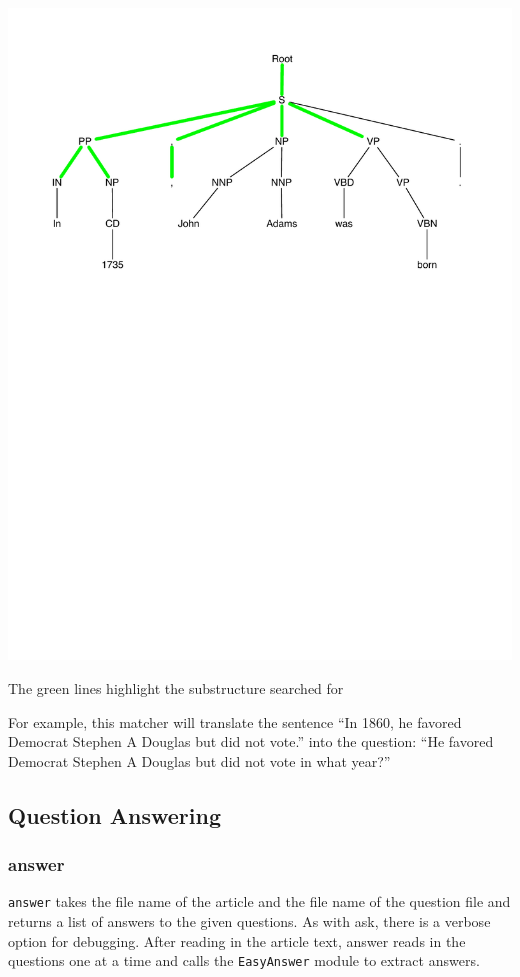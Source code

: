 \documentclass[11pt]{article}
\begin{document}
\begin{center}
  \includegraphics[scale=0.5]{date_matcher}
  
  \textsf{The green lines highlight the substructure searched for}
\end{center}

For example, this matcher will translate the sentence ``In 1860, he favored
Democrat Stephen A Douglas but did not vote.'' into the question: ``He favored
Democrat Stephen A Douglas but did not vote in what year?''

\subsection{Question Answering}
\subsubsection{answer}

\texttt{answer} takes the file name of the article and the file name of the
question file and returns a list of answers to the given questions. As with ask,
there is a verbose option for debugging. After reading in the article text,
answer reads in the questions one at a time and calls the \texttt{EasyAnswer}
module to extract answers.
\end{document}
